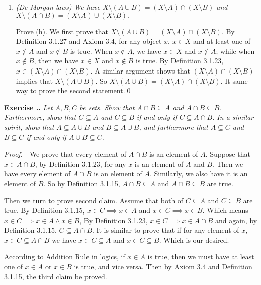 \documentclass{book}
\newcommand{\pff}{\vspace{.25em}\noindent\emph{Proof.}~~}
\newcounter{Exercise}[section]
\renewcommand{\theExercise}{\thesection.\arabic{Exercise}.}
\newcommand{\new}{\vspace{1.5em}\noindent\textbf{{Exercise \stepcounter{Exercise}\textbf{\theExercise}}} }
\begin{document}
\begin{enumerate}
    \item \emph{(De Morgan laws) We have $X\setminus(A\cup B)=(X\setminus A)\cap(X\setminus B)$ and $X\setminus(A\cap B)=(X\setminus A)\cup(X\setminus B).$}

    Prove (h). We first prove that $X\setminus(A\cup B)=(X\setminus A)\cap(X\setminus B)$. By Definition 3.1.27 and Axiom 3.4, for any object $x$, $x\in X$ and at least one of $x\notin A$ and $x\notin B$ is true. When $x\notin A$, we have $x\in X$ and $x\notin A$; while when $x\notin B$, then we have $x\in X$ and $x\notin B$ is true. By Definition 3.1.23, $x\in (X\setminus A)\cap(X\setminus B)$. A similar argument shows that $(X\setminus A)\cap(X\setminus B)$ implies that $X\setminus(A\cup B)$. So $X\setminus(A\cup B)=(X\setminus A)\cap(X\setminus B)$. It same way to prove the second statement.\qed
\end{enumerate}









\new\emph{Let $A,B,C$ be sets. Show that $A\cap B\subseteq A$ and $A\cap B\subseteq B$. Furthermore, show that $C\subseteq A$ and $C\subseteq B$ if and only if $C\subseteq A\cap B$. In a similar spirit, show that $A\subseteq A\cup B$ and $B\subseteq A\cup B$, and furthermore that $A\subseteq C$ and $B\subseteq C$ if and only if $A\cup B\subseteq C$.}

\pff We prove that every element of $A\cap B$ is an element of $A$. Suppose that $x\in A\cap B$, by Definition 3.1.23, for any $x$ is an element of $A$ and $B$. Then we have every element of $A\cap B$ is an element of $A$. Similarly, we also have it is an element of $B$. So by Definition 3.1.15, $A\cap B\subseteq A$ and $A\cap B\subseteq B$ are true.

Then we turn to prove second claim. Assume that both of $C\subseteq A$ and $C\subseteq B$ are true. By Definition 3.1.15, $x\in C\implies x\in A$ and $x\in C\implies x\in B$. Which means $x\in C\implies x\in A\land x\in B$, By Definition 3.1.23, $x\in C\implies x\in A\cap B$ and again, by Definition 3.1.15, $C\subseteq A\cap B$. It is similar to prove that if for any element of $x$, $x\in C\subseteq A\cap B$ we have $x\in C\subseteq A$ and $x\in C\subseteq B$. Which is our desired.

According to Addition Rule in logics, if $x\in A$ is true, then we must have at least one of $x\in A$ or $x\in B$ is true, and vice versa. Then by Axiom 3.4 and Definition 3.1.15, the third claim be proved.
\end{document}
